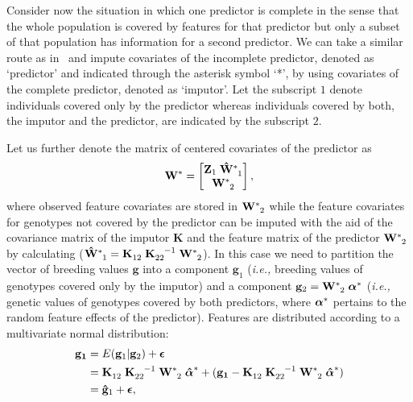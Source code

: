 \documentclass[12pt,titlepage]{article}
\begin{document}
Consider now the situation in which one predictor is complete in the sense that
the whole population is covered by features for that predictor but only a subset
of that population has information for a second predictor.
We can take a similar route as in~ and impute covariates 
of the incomplete predictor, denoted as `predictor' and indicated through the
asterisk symbol `*', by using covariates of the complete predictor, denoted as
`imputor'.
Let the subscript $1$ denote individuals covered only by the predictor whereas
individuals covered by both, the imputor and the predictor, are indicated by the subscript $2$.

Let us further denote the matrix of centered covariates of the predictor as
\begin{equation} \label{eq:incomplete-covariates}
\tensor[]{\mathbf{W}}{^{*}} =
\begin{bmatrix}
  \mathbf{Z}_{1} \; \tensor[]{\mathbf{\hat{W}}}{^{*}_{1}} \\
  \tensor[]{\mathbf{W}}{^{*}_{2}}
 \end{bmatrix},
\end{equation}
where observed feature covariates are stored in $\tensor[]{\mathbf{W}}{^{*}_{2}}$
while the feature covariates for genotypes not covered by the predictor can be
imputed with the aid of the covariance matrix of the imputor $\mathbf{K}$ and
the feature matrix of the predictor $\tensor[]{\mathbf{W}}{^{*}_{2}}$ by
calculating
($\tensor[]{\mathbf{\hat{W}}}{^{*}_{1}} = \tensor[]{\mathbf{K}}{_{12}} \;
\tensor[]{\mathbf{K}}{_{22}^{-1}} \; \tensor[]{\mathbf{W}}{^{*}_{2}}$).
In this case we need to partition the vector of breeding values $\mathbf{g}$
into a component $\mathbf{g}_{1}$ (\textit{i.e.,} breeding values of genotypes
covered only by the imputor) and a component
$\mathbf{g}_{2} = \tensor[]{\mathbf{W}}{^{*}_{2}} \; 
\tensor[]{\boldsymbol{\alpha}}{^{*}}$ (\textit{i.e.,} genetic
values of genotypes covered by both predictors, where
$\tensor[]{\boldsymbol{\alpha}}{^{*}}$ pertains to the random feature effects of
the predictor).
Features are distributed according to a multivariate normal distribution:
\begin{align} \label{eq:mrna1}
	\mathbf{g_1} &= E(\mathbf{g}_1|\mathbf{g}_2) +
	\boldsymbol{\epsilon} \\
	&= \tensor[]{\mathbf{K}}{_{12}} \;
       	\tensor[]{\mathbf{K}}{_{22}^{-1}} \;
       	\tensor[]{\mathbf{W}}{^{*}_{2}} \;
	\tensor[]{\boldsymbol{\hat{\alpha}}}{^{*}} +
       	(\mathbf{g_1} - \tensor[]{\mathbf{K}}{_{12}} \;
	\tensor[]{\mathbf{K}}{_{22}^{-1}} \;
       	\tensor[]{\mathbf{W}}{^{*}_{2}} \;
	\tensor[]{\boldsymbol{\hat{\alpha}}}{^{*}}) \\
	&= \mathbf{\hat{g}}_1 + \boldsymbol{\epsilon},
\end{align}
\end{document}
